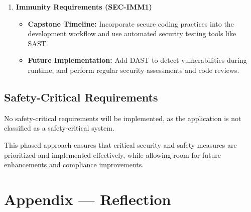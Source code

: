\documentclass{article}
\begin{document}
\begin{enumerate}
    \item \textbf{Immunity Requirements (SEC-IMM1)}
    \begin{itemize}
        \item \textbf{Capstone Timeline:} Incorporate secure coding practices into the development workflow and use automated security testing tools like SAST.
        \item \textbf{Future Implementation:} Add DAST to detect vulnerabilities during runtime, and perform regular security assessments and code reviews.
    \end{itemize}
\end{enumerate}

\subsection{Safety-Critical Requirements}
No safety-critical requirements will be implemented, as the application is not classified as a safety-critical system.

This phased approach ensures that critical security and safety measures are prioritized and implemented effectively, while allowing room for future enhancements and compliance improvements.

\newpage{}

\section*{Appendix --- Reflection}



\end{document}
